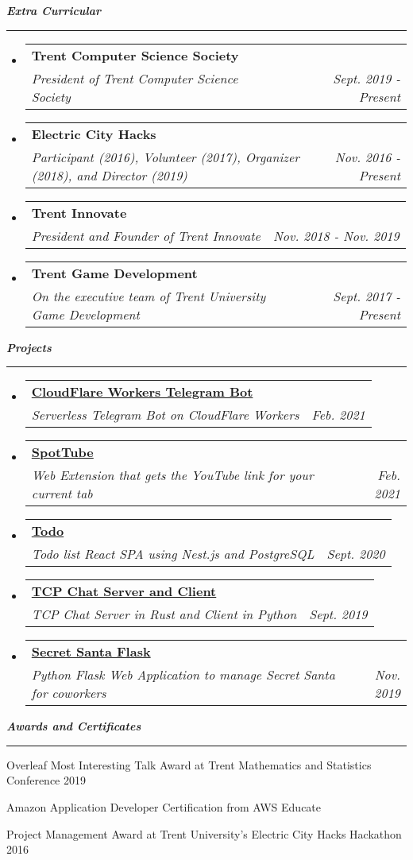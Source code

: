 \documentclass[letterpaper,11pt]{article}
\makeatletter
\newcommand{\mysection}[1]{\vspace{5pt} {\bfseries \textsl{#1}} \\ {\color{gray} \rule[5pt]{\textwidth}{1pt}}}
\newcommand{\ressubheading}[4]{\begin{tabular*}{6.5in}{l@{\extracolsep{\fill}}r}
        \textbf{#1} & #2 \\
        \textit{#3} & \textit{#4} \\
\end{tabular*}\vspace{-6pt}}
\makeatother
\begin{document}
\mysection{Extra Curricular}
\begin{itemize}
    \item
        \ressubheading{Trent Computer Science Society}{}{President of Trent Computer Science Society}{Sept. 2019 - Present}
    \item
        \ressubheading{Electric City Hacks}{}{Participant (2016), Volunteer
            (2017), Organizer (2018), and Director (2019)}{Nov. 2016 - Present}
    \item
        \ressubheading{Trent Innovate}{}{President and Founder of Trent Innovate}{Nov. 2018 - Nov. 2019}
    \item
        \ressubheading{Trent Game Development}{}{On the executive team of Trent University Game Development}{Sept. 2017 - Present}
\end{itemize}

\mysection{Projects}
\begin{itemize}
    \item
        \ressubheading{\href{https://github.com/codebam/cf-workers-telegram-bot}{CloudFlare Workers Telegram Bot}}{}{Serverless Telegram Bot on CloudFlare Workers}{Feb. 2021}
    \item
        \ressubheading{\href{https://github.com/codebam/spottube}{SpotTube}}{}{Web Extension that gets the YouTube link for your current tab}{Feb. 2021}
    \item
        \ressubheading{\href{https://github.com/codebam/todo}{Todo}}{}{Todo list React SPA using Nest.js and PostgreSQL}{Sept. 2020}
    \item
        \ressubheading{\href{https://github.com/codebam/chatserver-rust}{TCP Chat Server and Client}}{}{TCP Chat Server in Rust and Client in Python}{Sept. 2019}
    \item
        \ressubheading{\href{https://github.com/codebam/secret\_santa}{Secret Santa Flask}}{}{Python Flask Web Application to manage Secret Santa for coworkers}{Nov. 2019}
\end{itemize}

\pagebreak

\mysection{Awards and Certificates}
\begin{description}
    \item Overleaf Most Interesting Talk Award at Trent Mathematics and Statistics Conference 2019
    \item Amazon Application Developer Certification from AWS Educate
    \item Project Management Award at Trent University's Electric City Hacks Hackathon 2016
\end{description}
\end{document}
